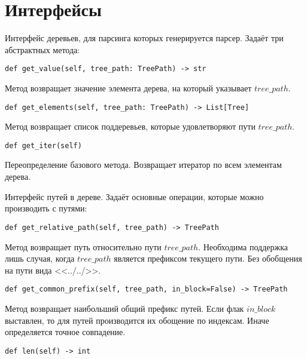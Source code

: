 \chapter{Интерфейсы}



Интерфейс деревьев, для парсинга которых генерируется парсер. Задаёт три абстрактных метода:
\\

\begin{lstlisting}
def get_value(self, tree_path: TreePath) -> str
\end{lstlisting}
Метод возвращает значение элемента дерева, на который указывает $tree\_path$.
\\

\begin{lstlisting}
def get_elements(self, tree_path: TreePath) -> List[Tree]
\end{lstlisting}
Метод возвращает список поддеревьев, которые удовлетворяют пути $tree\_path$.
\\

\begin{lstlisting}
def get_iter(self)
\end{lstlisting}
Переопределение базового метода. Возвращает итератор по всем элементам дерева.


Интерфейс путей в дереве. Задаёт основные операции, которые можно производить с путями:
\\

\begin{lstlisting}
def get_relative_path(self, tree_path) -> TreePath
\end{lstlisting}

Метод возвращает путь относительно пути $tree\_path$. Необходима поддержка лишь случая, когда $tree\_path$ является префиксом текущего пути. Без обобщения на пути вида <<../../>>.
\\

\begin{lstlisting}
def get_common_prefix(self, tree_path, in_block=False) -> TreePath
\end{lstlisting}

Метод возвращает наибольший общий префикс путей. Если флак $in\_block$ выставлен, то для путей производится их обощение по индексам. Иначе определяется точное совпадение.
\\

\begin{lstlisting}
def len(self) -> int
\end{lstlisting}

